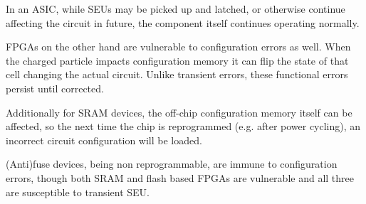\documentclass[12pt,final,oneside]{memoir} %
\begin{document}
%
In an \ac{ASIC}, while \acp{SEU} may be picked up and latched, or otherwise continue affecting the circuit in future, the component itself continues operating normally.

\acp{FPGA} on the other hand are vulnerable to configuration errors as well. When the charged particle impacts configuration memory it can flip the state of that cell changing the actual circuit. Unlike transient errors, these functional errors persist until corrected.

Additionally for \ac{SRAM} devices, the off-chip configuration memory itself can be affected, so the next time the chip is reprogrammed (e.g. after power cycling), an incorrect circuit configuration will be loaded.

(Anti)fuse devices, being non reprogrammable, are immune to configuration errors, though both \ac{SRAM} and flash based \acp{FPGA} are vulnerable and all three are susceptible to transient \ac{SEU}\cite{HFPP}.
\end{document}
